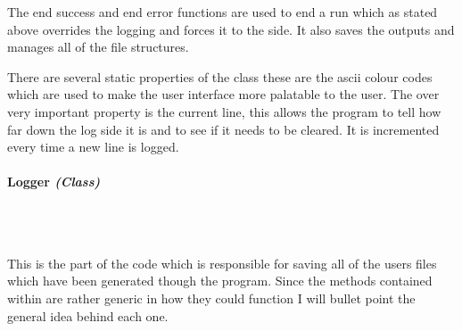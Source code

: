 \begin{FlushLeft}
    The end success and end error functions are used to end a run which as stated above overrides the logging and forces it to the side. It also saves the outputs and manages all of the file structures. \\ \bk

    There are several static properties of the class these are the ascii colour codes which are used to make the user interface more palatable to the user. The over very important property is the current line, this allows the program to tell how far down the log side it is and to see if it needs to be cleared. It is incremented every time a new line is logged. \\

    \bk
    \pagebreak
    \paragraph{Logger \textit{(Class)}} \mbox{} \\

    \begin{figure}[H]
        \centering
    \end{figure}\\

    This is the part of the code which is responsible for saving all of the users files which have been generated though the program. Since the methods contained within are rather generic in how they could function I will bullet point the general idea behind each one.


\end{FlushLeft}
